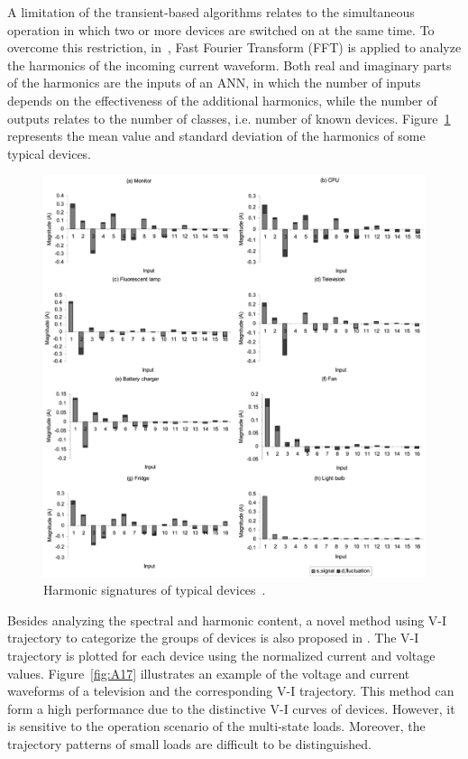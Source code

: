 A limitation of the transient-based algorithms relates to the simultaneous operation in which two or more devices are switched on at the same time. To overcome this restriction, in~\cite{Srinivasan06PD}, Fast Fourier Transform (FFT) is applied to analyze the harmonics of the incoming current waveform. Both real and imaginary parts of the harmonics are the inputs of an ANN, in which the number of inputs depends on the effectiveness of the additional harmonics, while the number of outputs relates to the number of classes, i.e. number of known devices. Figure~\ref{fig:A16} represents the mean value and standard deviation of the harmonics of some typical devices.
\begin{figure}
\centering
\includegraphics[width=1\textwidth]{./chapters/chapter2/images/harmonic_of_devices.pdf} 
\caption{Harmonic signatures of typical devices~\cite{Srinivasan06PD}.} 
\label{fig:A16} 
\end{figure}

Besides analyzing the spectral and harmonic content, a novel method using V-I trajectory to categorize the groups of devices is also proposed in \cite{Lee04,Lam07}. The V-I trajectory is plotted for each device using the normalized current and voltage values. Figure~\ref{fig:A17} illustrates an example of the voltage and current waveforms of a television and the corresponding V-I trajectory. This method can form a high performance due to the distinctive V-I curves of devices. However, it is sensitive to the operation scenario of the multi-state loads. Moreover, the trajectory patterns of small loads are difficult to be distinguished.

